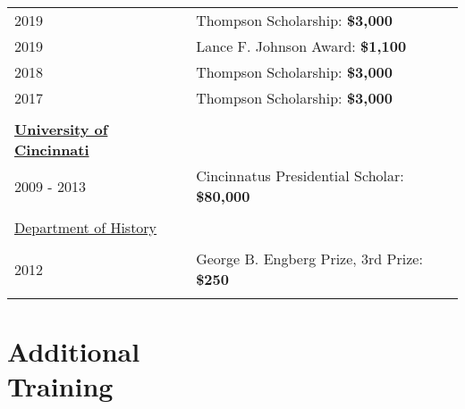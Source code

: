 \documentclass[margin,line,pifont,palatino,courier]{res}
\newenvironment{list1}{
  \begin{list}{\ding{113}}{%
      \setlength{\itemsep}{0in}
      \setlength{\parsep}{0in} \setlength{\parskip}{0in}
      \setlength{\topsep}{0in} \setlength{\partopsep}{0in}
      \setlength{\leftmargin}{0.17in}}}{\end{list}}
\begin{document}
\begin{resume}
\begin{tabular}{ll}
  2019       & Thompson Scholarship: \bf{\$3,000}\\
  2019       & Lance F. Johnson Award: \bf{\$1,100}\\
  2018       & Thompson Scholarship: \bf{\$3,000}\\
  2017       & Thompson Scholarship: \bf{\$3,000}\\
  \\
  \textbf{\underline{University of Cincinnati}}&\\
  2009 - 2013 & Cincinnatus Presidential Scholar: \bf{\$80,000}\\
  \\
  \underline{Department of History}&\\
  \\
  2012       & George B. Engberg Prize, 3rd Prize: \bf{\$250}  \\
  \\
\end{tabular}




\newpage
\section{\sc Additional\\ Training}


\end{resume}
\end{document}
